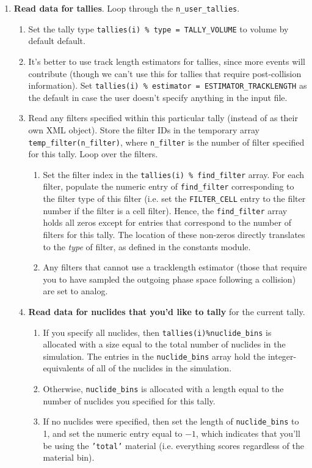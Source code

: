 \documentclass[10pt]{article}
\numberwithin{equation}{section} %
\begin{document}
\begin{enumerate}
\item {\bf Read data for tallies}. Loop through the {\tt n\_user\_tallies}.
	
	\begin{enumerate}
	\item Set the tally type {\tt tallies(i) \% type = TALLY\_VOLUME} to volume by default default. 
	\item It's better to use track length estimators for tallies, since more events will contribute (though we can't use this for tallies that require post-collision information). Set {\tt tallies(i) \% estimator = ESTIMATOR\_TRACKLENGTH} as the default in case the user doesn't specify anything in the input file. 
	\item Read any filters specified within this particular tally (instead of as their own XML object). Store the filter IDs in the temporary array {\tt temp\_filter(n\_filter)}, where {\tt n\_filter} is the number of filter specified for this tally. Loop over the filters.
		
		\begin{enumerate}
		\item Set the filter index in the {\tt tallies(i) \% find\_filter} array. For each filter, populate the numeric entry of {\tt find\_filter} corresponding to the filter type of this filter (i.e. set the {\tt FILTER\_CELL} entry to the filter number if the filter is a cell filter). Hence, the {\tt find\_filter} array holds all zeros except for entries that correspond to the number of filters for this tally. The location of these non-zeros directly translates to the {\it type} of filter, as defined in the constants module.
		\item Any filters that cannot use a tracklength estimator (those that require you to have sampled the outgoing phase space following a collision) are set to analog.
		\end{enumerate}
	\item {\bf Read data for nuclides that you'd like to tally} for the current tally. 
		
		\begin{enumerate}
		\item If you specify all nuclides, then {\tt tallies(i)\%nuclide\_bins} is allocated with a size equal to the total number of nuclides in the simulation. The entries in the {\tt nuclide\_bins} array hold the integer-equivalents of all of the nuclides in the simulation.
		\item Otherwise, {\tt nuclide\_bins} is allocated with a length equal to the number of nuclides you specified for this tally. 
		\item If no nuclides were specified, then set the length of {\tt nuclide\_bins} to 1, and set the numeric entry equal to \(-1\), which indicates that you'll be using the {\tt 'total'} material (i.e. everything scores regardless of the material bin).
		\end{enumerate}
	

\end{enumerate}
\end{enumerate}
\end{document}
